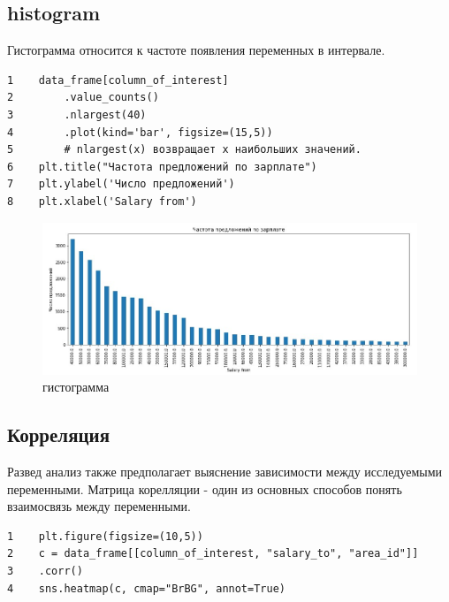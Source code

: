 \documentclass[12pt, a4paper]{article}
\begin{document}
{\subsection{histogram}

Гистограмма относится к частоте появления переменных в интервале.

\begin{verbatim}
1    data_frame[column_of_interest]
2        .value_counts()
3        .nlargest(40)
4        .plot(kind='bar', figsize=(15,5)) 
5        # nlargest(x) возвращает x наибольших значений.
6    plt.title("Частота предложений по зарплате")
7    plt.ylabel('Число предложений')
8    plt.xlabel('Salary from')
\end{verbatim}

\begin{figure}[h]
    \begin{center}
        \includegraphics[scale=0.5,keepaspectratio]
        {Pictures/Picture_9.jpg}
        \caption{гистограмма}
        \label{Picture_9}
    \end{center}
\end{figure}

\newpage

\subsection{Корреляция}

Развед анализ также предполагает выяснение зависимости 
между исследуемыми переменными.
Матрица корелляции - один из основных способов понять 
взаимосвязь между переменными.

\begin{verbatim}
1    plt.figure(figsize=(10,5))
2    c = data_frame[[column_of_interest, "salary_to", "area_id"]]
3    .corr()
4    sns.heatmap(c, cmap="BrBG", annot=True)
\end{verbatim}

}
\end{document}
